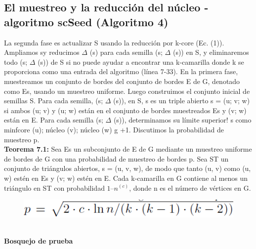 \subsection{El muestreo y la reducción del núcleo - algoritmo scSeed (Algoritmo 4)}
La segunda fase es actualizar S usando la reducción por k-core (Ec. (1)). Ampliamos sy reducimos \begin{math}\Delta\end{math} (s) para cada semilla (s; \begin{math}\Delta\end{math} (s)) en S, y eliminaremos todo (s; \begin{math}\Delta\end{math} (s)) de S si no puede ayudar a encontrar una k-camarilla donde k se proporciona como una entrada del algoritmo (línea 7-33).
En la primera fase, muestreamos un conjunto de bordes del conjunto de bordes E de G, denotado como Es, usando un muestreo uniforme. Luego construimos el conjunto inicial de semillas S. Para cada semilla, (s; \begin{math}\Delta\end{math} (s)), en S, s es un triple abierto s = (u; v; w) si ambos (u; v) y (u; w) están en el conjunto de bordes muestreados Es y (v; w) están en E. Para cada semilla (s; \begin{math}\Delta\end{math} (s)), determinamos su límite superior! s como minfcore (u); núcleo (v); núcleo (w) g +1. Discutimos la probabilidad de muestreo p.
\\
\textbf{Teorema 7.1:} Sea Es un subconjunto de E de G mediante un muestreo uniforme de bordes de G con una probabilidad de muestreo de bordes p. Sea ST un conjunto de triángulos abiertos, s = (u, v, w), de modo que tanto (u, v) como (u, w) estén en Es y (v; w) estén en E. Cada k-camarilla en G contiene al menos un triángulo en ST con probabilidad \begin{math} 1 – n^(c)\end{math}, donde n es el número de vértices en G.
\\
\begin{figure}[h!]
\centering
\includegraphics[scale=.8]{img/imagen12.png}
\label{Comandos}
\end{figure}
\\
\textbf{Bosquejo de prueba}
\\
